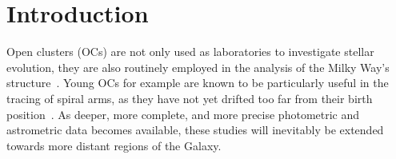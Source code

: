 \documentclass{aa}
\begin{document}

\maketitle


\section{Introduction}

 Open clusters (OCs) are not only used as laboratories to investigate stellar
 evolution, they are also routinely employed in the analysis of the Milky Way's
 structure~\citep{Loktin_1992,Moitinho_2006,Vazquez2008,Moitinho_2010}.
 Young OCs for example are known to be particularly
 useful in the tracing of spiral arms, as they have not yet drifted too far
 from their birth position~\citep{carraro_2013,Molina_2018}. As deeper, more
 complete, and more precise photometric and astrometric data becomes available,
 these studies will inevitably be extended towards more distant regions of the
 Galaxy.
\end{document}
